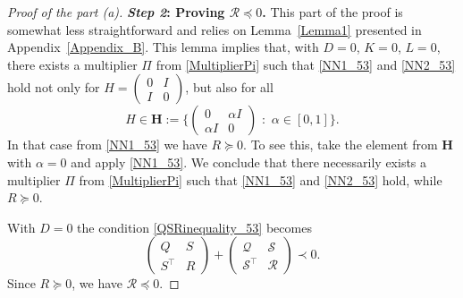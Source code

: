 \documentclass[11pt,a4paper,oneside,DIV=12,headings=small]{scrartcl}
\newcommand{\cS}{\mathcal{S}}
\newcommand{\cQ}{\mathcal{Q}}
\newcommand{\cR}{\mathcal{R}}
\theoremstyle{plain}
\begin{document}
\begin{proof}[Proof of the part (a)]
\medskip

\textbf{\emph{Step 2}: Proving $\cR\preceq 0$.} \newline 
This part of the proof is somewhat less straightforward and relies on Lemma~\ref{Lemma1} presented in Appendix~\ref{Appendix_B}. This lemma implies that, with $D=0$, $K=0$, $L=0$, there exists a multiplier $\Pi$ from \eqref{MultiplierPi} such that \eqref{NN1_53} and \eqref{NN2_53} hold not only for $H=\left(\begin{smallmatrix} 0 & I \\ I & 0 \end{smallmatrix}\right)$, but also for all 
\[H \in \mathbf{H}:=\Big\{ \begin{pmatrix} 0 & \alpha I \\ \alpha I & 0  \end{pmatrix} \,\, : \,\, \alpha \in [0,1] \Big\}. \]
In that case from \eqref{NN1_53} we have $R \succeq 0$. To see this, take the element from $\mathbf{H}$ with $\alpha =0$ and apply \eqref{NN1_53}. We conclude that there necessarily exists a multiplier $\Pi$ from \eqref{MultiplierPi} such that \eqref{NN1_53} and \eqref{NN2_53} hold, while $R\succeq 0$.

With $D=0$ the condition \eqref{QSRinequality_53} becomes
\[\begin{pmatrix} Q & S \\ S^\top & R \end{pmatrix} + \begin{pmatrix}  \cQ & \cS \\ \cS^\top & \cR  \end{pmatrix} \prec 0.\]
Since $R \succeq 0$, we have $\cR \preceq 0$.

\medskip


\end{proof}
\end{document}
